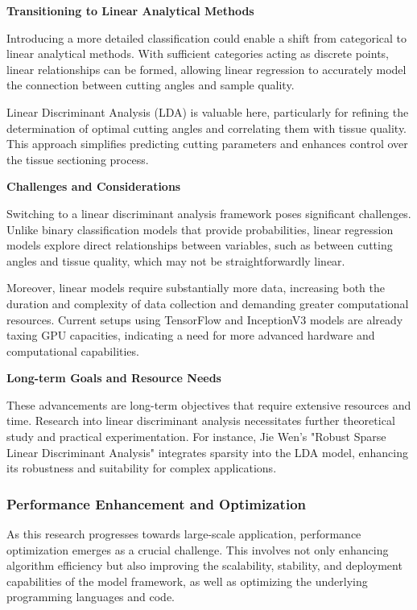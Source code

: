 \textbf{Transitioning to Linear Analytical Methods}

Introducing a more detailed classification could enable a shift from categorical to linear analytical methods. With sufficient categories acting as discrete points, linear relationships can be formed, allowing linear regression to accurately model the connection between cutting angles and sample quality.

Linear Discriminant Analysis (LDA) is valuable here, particularly for refining the determination of optimal cutting angles and correlating them with tissue quality. This approach simplifies predicting cutting parameters and enhances control over the tissue sectioning process.

\textbf{Challenges and Considerations}

Switching to a linear discriminant analysis framework poses significant challenges. Unlike binary classification models that provide probabilities, linear regression models explore direct relationships between variables, such as between cutting angles and tissue quality, which may not be straightforwardly linear.

Moreover, linear models require substantially more data, increasing both the duration and complexity of data collection and demanding greater computational resources. Current setups using TensorFlow and InceptionV3 models are already taxing GPU capacities, indicating a need for more advanced hardware and computational capabilities.

\textbf{Long-term Goals and Resource Needs}

These advancements are long-term objectives that require extensive resources and time. Research into linear discriminant analysis necessitates further theoretical study and practical experimentation. For instance, Jie Wen's "Robust Sparse Linear Discriminant Analysis" integrates sparsity into the LDA model, enhancing its robustness and suitability for complex applications.



\subsubsection{Performance Enhancement and Optimization}

As this research progresses towards large-scale application, performance optimization emerges as a crucial challenge. This involves not only enhancing algorithm efficiency but also improving the scalability, stability, and deployment capabilities of the model framework, as well as optimizing the underlying programming languages and code.

